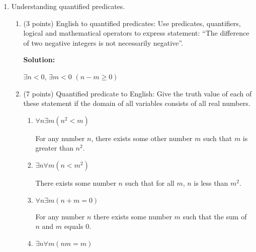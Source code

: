 \documentclass[11pt]{article}
\begin{document}
\begin{enumerate}
\begin{enumerate}
\begin{proof}
\end{proof}

\item (Rosen 1.3/28, 5 points) $p\leftrightarrow q$ and $\lnot p \leftrightarrow \lnot q$

\begin{proof}

$$ p\leftrightarrow q $$
$$ \equiv (q \rightarrow p) \land (p \rightarrow q) $$
$$ \equiv (p \lor \lnot q) \land (q \lor \lnot p) $$
$$ \equiv (\lnot(\lnot p) \lor \lnot q) \land (\lnot(\lnot q) \lor \lnot p) $$
$$ \equiv (\lnot p \rightarrow \lnot q) \land (\lnot q \rightarrow \lnot p) $$
$$ \equiv \lnot p \leftrightarrow \lnot q  $$

\end{proof}

\end{enumerate}

\item Understanding quantified predicates.
\begin{enumerate}
\item (3 points) English to quantified predicates: 
Use predicates, quantifiers, logical and mathematical operators to express statement:
``The difference of two negative integers is not necessarily negative''.

{\bf Solution:}

$\exists n < 0$, $\exists m < 0$ $(n - m \geq 0)$

\item (7 points) Quantified predicate to English:
Give the truth value of each of these statement if the domain of all variables consists of all real numbers. 
\begin{enumerate}
\item $\forall n\exists m (n^2 < m)$

For any number $n$, there exists some other number $m$ such that $m$ is greater than $n^2$.  

\item $\exists n\forall m (n<m^2)$

There exists some number $n$ such that for all $m$, $n$ is less than $m^2$.  

\item $\forall n\exists m (n+m = 0)$

For any number $n$ there exists some number $m$ such that the sum of $n$ and $m$ equals $0$.  

\item $\exists n\forall m (nm = m)$


\end{enumerate}
\end{enumerate}
\end{enumerate}
\end{document}
